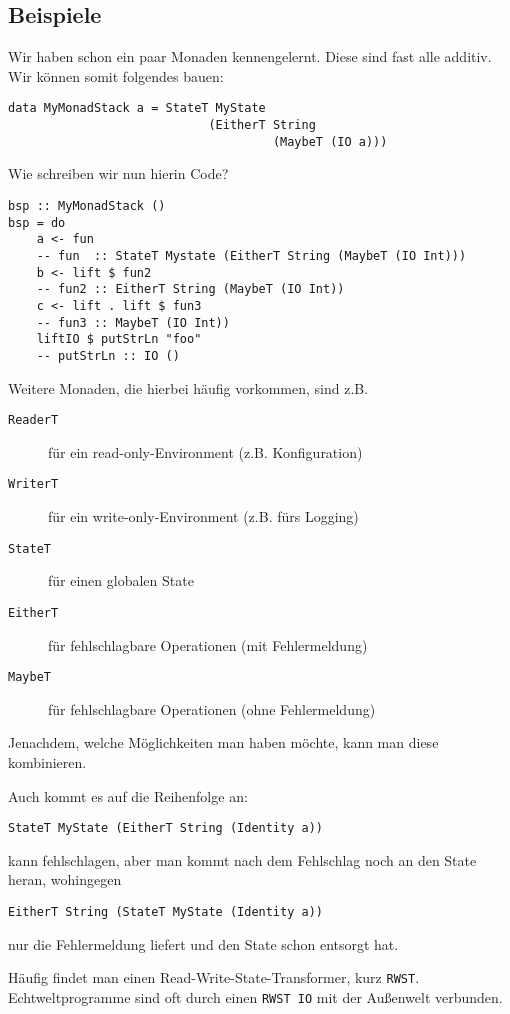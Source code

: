 \documentclass{beamer}
\begin{document}
\subsection{Beispiele}

\begin{frame}[fragile]
Wir haben schon ein paar Monaden kennengelernt. Diese sind fast alle additiv. Wir können somit folgendes bauen:
\pause
\begin{verbatim}
data MyMonadStack a = StateT MyState 
                            (EitherT String 
                                     (MaybeT (IO a)))
\end{verbatim}
\pause
Wie schreiben wir nun hierin Code?
\begin{verbatim}
bsp :: MyMonadStack ()
bsp = do
    a <- fun                
    -- fun  :: StateT Mystate (EitherT String (MaybeT (IO Int)))
    b <- lift $ fun2        
    -- fun2 :: EitherT String (MaybeT (IO Int))
    c <- lift . lift $ fun3 
    -- fun3 :: MaybeT (IO Int))
    liftIO $ putStrLn "foo"
    -- putStrLn :: IO ()
\end{verbatim}
\end{frame}

\begin{frame}[fragile]
Weitere Monaden, die hierbei häufig vorkommen, sind z.B.
\begin{description}
 \item[\texttt{ReaderT}] für ein read-only-Environment (z.B. Konfiguration)
 \pause
 \item[\texttt{WriterT}] für ein write-only-Environment (z.B. fürs Logging)
 \pause
 \item[\texttt{StateT}] für einen globalen State
 \pause
 \item[\texttt{EitherT}] für fehlschlagbare Operationen (mit Fehlermeldung)
 \pause
 \item[\texttt{MaybeT}] für fehlschlagbare Operationen (ohne Fehlermeldung)
\end{description}
\pause
Jenachdem, welche Möglichkeiten man haben möchte, kann man diese kombinieren.
\end{frame}

\begin{frame}[fragile]
Auch kommt es auf die Reihenfolge an:
\begin{verbatim}
StateT MyState (EitherT String (Identity a))
\end{verbatim}
kann fehlschlagen, aber man kommt nach dem Fehlschlag noch an den State heran\pause, wohingegen
\begin{verbatim}
EitherT String (StateT MyState (Identity a))
\end{verbatim}
nur die Fehlermeldung liefert und den State schon entsorgt hat.\\\par
\pause
Häufig findet man einen Read-Write-State-Transformer, kurz \texttt{RWST}.\\
\pause
Echtweltprogramme sind oft durch einen \texttt{RWST IO} mit der Außenwelt verbunden.
\end{frame}
\end{document}
